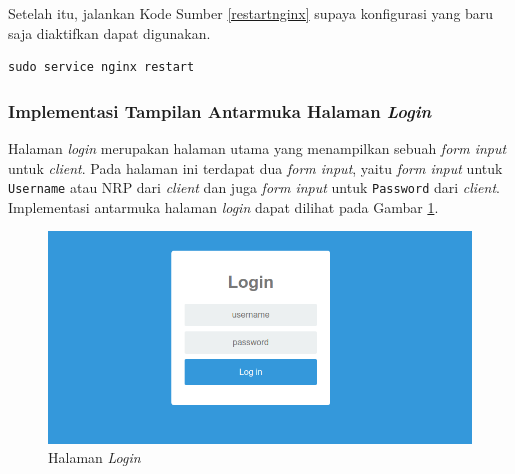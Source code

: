 Setelah itu, jalankan Kode Sumber \ref{restartnginx} supaya konfigurasi yang baru saja diaktifkan dapat digunakan.\\
\begin{lstlisting}[frame=single,tabsize=2,breaklines,captionpos=b,caption=Command untuk merestart Nginx,language=Python,label=restartnginx]
sudo service nginx restart
\end{lstlisting}

\subsubsection{Implementasi Tampilan Antarmuka Halaman \textit{Login}}
Halaman \textit{login} merupakan halaman utama yang menampilkan sebuah \textit{form input} untuk \textit{client}. Pada halaman ini terdapat dua \textit{form input}, yaitu \textit{form input} untuk \texttt{Username} atau NRP dari \textit{client} dan juga \textit{form input} untuk \texttt{Password} dari \textit{client}. Implementasi antarmuka halaman \textit{login} dapat dilihat pada Gambar \ref{implementasihalamanlogin}.

\begin{figure}[H]
	\centering
	\includegraphics[width=\linewidth]{images/bab4/halamanlogin}
	\caption{Halaman \textit{Login}}
	\label{implementasihalamanlogin}
\end{figure}

